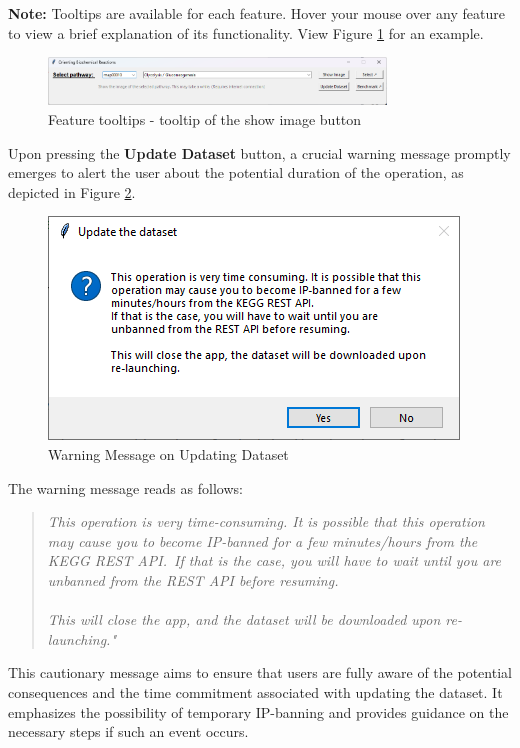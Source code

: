 \textbf{Note:} Tooltips are available for each feature. Hover your mouse over any feature to view a brief explanation of its functionality. View Figure \ref{fig:show_image_tooltip} for an example.

\begin{figure}[H]
    \centering
    \includegraphics[width=0.8\textwidth]{Design of the User Interface/tip_show_image.png}
    \caption{Feature tooltips - tooltip of the show image button}
    \label{fig:show_image_tooltip}
\end{figure}

Upon pressing the \textbf{Update Dataset} button, a crucial warning message promptly emerges to alert the user about the potential duration of the operation, as depicted in Figure \ref{fig:update_warning}.

\begin{figure} [H]
\centering
\includegraphics[width=0.5\linewidth]{Design of the User Interface/update_warning.png}
\caption{Warning Message on Updating Dataset}
\label{fig:update_warning}
\end{figure}

The warning message reads as follows:

\begin{quote}
\textit{This operation is very time-consuming. It is possible that this operation may cause you to become IP-banned for a few minutes/hours from the KEGG REST API.\
If that is the case, you will have to wait until you are unbanned from the REST API before resuming.\\
\\
This will close the app, and the dataset will be downloaded upon re-launching."}
\end{quote}

This cautionary message aims to ensure that users are fully aware of the potential consequences and the time commitment associated with updating the dataset. It emphasizes the possibility of temporary IP-banning and provides guidance on the necessary steps if such an event occurs.

